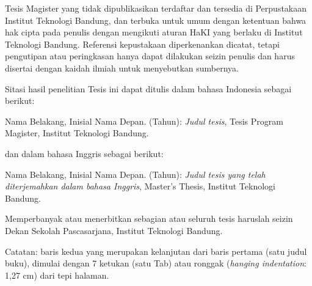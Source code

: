 \documentclass{itb-thesis}
\begin{document}
\cover
\approvalpage

\thesisguide
\begin{onehalfspace}

Tesis Magister yang tidak dipublikasikan terdaftar dan tersedia di Perpustakaan Institut Teknologi Bandung, dan terbuka untuk umum dengan ketentuan bahwa hak cipta pada penulis dengan mengikuti aturan HaKI yang berlaku di Institut Teknologi Bandung. Referensi kepustakaan diperkenankan dicatat, tetapi pengutipan atau peringkasan hanya dapat dilakukan seizin penulis dan harus disertai dengan kaidah ilmiah untuk menyebutkan sumbernya.

\vspace{14pt}

Sitasi hasil penelitian Tesis ini dapat ditulis dalam bahasa Indonesia sebagai berikut:

\begin{hangparas}{1.27cm}{1}
Nama Belakang, Inisial Nama Depan. (Tahun): \textit{Judul tesis}, Tesis Program Magister, Institut Teknologi Bandung.
\end{hangparas}

\vspace{14pt}

dan dalam bahasa Inggris sebagai berikut:

\vspace{14pt}

\begin{hangparas}{1.27cm}{1}
Nama Belakang, Inisial Nama Depan. (Tahun): \textit{Judul tesis yang telah diterjemahkan dalam bahasa Inggris}, Master's Thesis, Institut Teknologi Bandung.
\end{hangparas}

\vspace{14pt}

Memperbanyak atau menerbitkan sebagian atau seluruh tesis haruslah seizin Dekan Sekolah Pascasarjana, Institut Teknologi Bandung.

\vspace{14pt}

Catatan: baris kedua yang merupakan kelanjutan dari baris pertama (satu judul buku), dimulai dengan 7 ketukan (satu Tab) atau ronggak (\textit{hanging indentation}: 1,27 cm) dari tepi halaman.
\end{onehalfspace}
\end{document}
